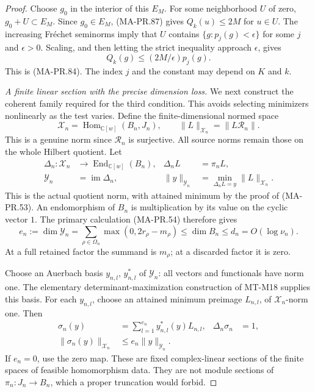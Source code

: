 \begin{proof}
Choose \(g_0\) in the interior of this \(E_M\).
For some neighborhood \(U\) of zero,
\(g_0+U\subset E_M\).  Since \(g_0\in E_M\),
(MA-PR.87) gives \(Q_k(u)\le2M\) for \(u\in U\).
The increasing Fr\'echet seminorms imply that \(U\)
contains \(\{g:p_j(g)<\epsilon\}\) for some \(j\)
and \(\epsilon>0\).
Scaling, and then letting the strict inequality
approach \(\epsilon\), gives
\[
                  Q_k(g)\le (2M/\epsilon)p_j(g).
 \tag{MA-PR.90}
\]
This is (MA-PR.84).  The index \(j\) and the constant
may depend on \(K\) and \(k\).

\emph{A finite linear section with the precise dimension loss.}
We next construct the coherent family required for
the third condition.  This avoids selecting minimizers
nonlinearly as the test varies.
Define the finite-dimensional normed space
\[
 \mathcal X_n=\operatorname{Hom}_{\mathbb C[w]}(B_n,J_n),
 \qquad
       \|L\|_{\mathcal X_n}=\|L\mathscr R_n\| .
 \tag{MA-PR.91}
\]
This is a genuine norm since \(\mathscr R_n\) is
surjective.  All source norms remain those on the
whole Hilbert quotient.
Let
\[
 \begin{aligned}
 \Delta_n:\mathcal X_n&\longrightarrow
                 \operatorname{End}_{\mathbb C[w]}(B_n),
             &\Delta_nL&=\pi_nL,\\
 \mathcal Y_n&=\operatorname{im}\Delta_n,
             &\|y\|_{\mathcal Y_n}
                 &=\min_{\Delta_nL=y}\|L\|_{\mathcal X_n}.
 \end{aligned}
 \tag{MA-PR.92}
\]
This is the actual quotient norm, with attained
minimum by the proof of (MA-PR.53).
An endomorphism of \(B_n\) is multiplication by
its value on the cyclic vector \(1\).
The primary calculation (MA-PR.54) therefore gives
\[
 e_n:=\dim\mathcal Y_n
       =\sum_{\rho\in\Omega_n}
                     \max(0,2r_\rho-m_\rho)
       \le\dim B_n\le d_n=O(\log\nu_n).
 \tag{MA-PR.93}
\]
At a full retained factor the summand is \(m_\rho\);
at a discarded factor it is zero.

Choose an Auerbach basis \(y_{n,l}\), \(y^*_{n,l}\)
of \(\mathcal Y_n\): all vectors and functionals
have norm one.  The elementary determinant-maximization
construction of MT-M18 supplies this basis.
For each \(y_{n,l}\), choose an attained minimum
preimage \(L_{n,l}\), of \(\mathcal X_n\)-norm one.
Then
\[
 \begin{aligned}
 \sigma_n(y)&=\sum_{l=1}^{e_n}y^*_{n,l}(y)L_{n,l},&
 \Delta_n\sigma_n&=1,\\
 \|\sigma_n(y)\|_{\mathcal X_n}
                  &\le e_n\|y\|_{\mathcal Y_n}.
 \end{aligned}
 \tag{MA-PR.94}
\]
If \(e_n=0\), use the zero map.
These are fixed complex-linear sections of the
finite spaces of feasible homomorphism data.
They are not module sections of
\(\pi_n:J_n\to B_n\), which a proper truncation
would forbid.


\end{proof}
